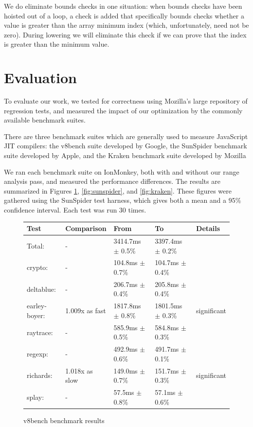 \documentclass{article}
\begin{document}
We do eliminate bounds checks in one situation: when bounds checks
have been hoisted out of a loop, a check is added that specifically
bounds checks whether a value is greater than the array minimum index
(which, unfortunately, need not be zero). During lowering we will
eliminate this check if we can prove that the index is greater than
the minimum value.

\section{Evaluation}
To evaluate our work, we tested for correctness using Mozilla's large
repository of regression tests, and measured the impact of our
optimization by the commonly available benchmark suites.

There are three benchmark suites which are generally used to measure JavaScript
JIT compilers: the v8bench suite developed by Google\cite{v8bench}, the SunSpider benchmark
suite developed by Apple\cite{sunspider}, and the Kraken benchmark suite developed by Mozilla\cite{kraken}

We ran each benchmark suite on IonMonkey, both with and without our range
analysis pass, and measured the performance differences. The results are
summarized in Figures \ref{fig:v8bench}, \ref{fig:sunspider}, and
\ref{fig:kraken}. These figures were gathered using the SunSpider test harness,
which gives both a mean and a 95\% confidence interval\cite{sunspider}. Each
test was run 30 times.

\begin{figure}[H]
\begin{tabular}{|l|l|l|l|l|}
\hline
    \textbf{Test}     &\textbf{Comparison} & \textbf{From}        & \textbf{To}           &  \textbf{Details} \\
\hline\hline
    Total:            &   -                & 3414.7ms $\pm$ 0.5\% &  3397.4ms $\pm$ 0.2\% & \\
\hline
\hline  crypto:       &   -                &  104.8ms $\pm$ 0.7\% &   104.7ms $\pm$ 0.4\% & \\
\hline  deltablue:    &   -                &  206.7ms $\pm$ 0.4\% &   205.8ms $\pm$ 0.4\% & \\
\hline  earley-boyer: &   1.009x as fast   & 1817.8ms $\pm$ 0.8\% &  1801.5ms $\pm$ 0.3\% &     significant \\
\hline  raytrace:     &   -                &  585.9ms $\pm$ 0.5\% &   584.8ms $\pm$ 0.3\% & \\
\hline  regexp:       &   -                &  492.9ms $\pm$ 0.6\% &   491.7ms $\pm$ 0.1\% & \\
\hline  richards:     &   1.018x as slow   &  149.0ms $\pm$ 0.7\% &   151.7ms $\pm$ 0.3\% &     significant \\
\hline  splay:        &   -                &   57.5ms $\pm$ 0.8\% &    57.1ms $\pm$ 0.6\% & \\
\hline
\end{tabular}
\caption{v8bench benchmark results}
\label{fig:v8bench}
\end{figure}
\end{document}
